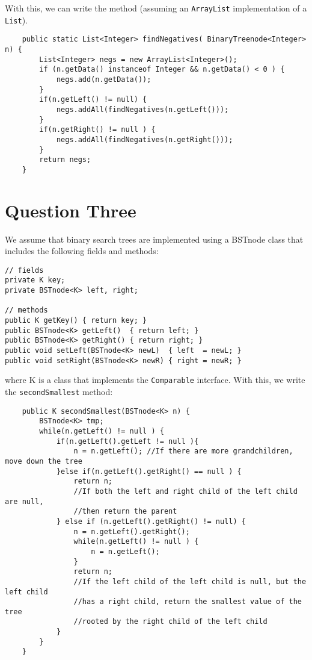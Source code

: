 \documentclass[11pt,letterpaper]{article}
\begin{document}
With this, we can write the method (assuming an \texttt{ArrayList} implementation of a \texttt{List}).
\begin{lstlisting}
	public static List<Integer> findNegatives( BinaryTreenode<Integer> n) { 
		List<Integer> negs = new ArrayList<Integer>();
		if (n.getData() instanceof Integer && n.getData() < 0 ) {
			negs.add(n.getData());
		}
		if(n.getLeft() != null) {
			negs.addAll(findNegatives(n.getLeft()));
		}
		if(n.getRight() != null ) {
			negs.addAll(findNegatives(n.getRight()));
		}
		return negs;	
	}
\end{lstlisting}


\section{Question Three}
We assume that binary search trees are implemented using a BSTnode class that includes the following fields and methods:
\begin{lstlisting}
// fields
private K key;
private BSTnode<K> left, right;
 
// methods
public K getKey() { return key; }
public BSTnode<K> getLeft()  { return left; }
public BSTnode<K> getRight() { return right; }
public void setLeft(BSTnode<K> newL)  { left  = newL; }
public void setRight(BSTnode<K> newR) { right = newR; }
\end{lstlisting}
where K is a class that implements the \texttt{Comparable} interface. With this, we write the \texttt{secondSmallest} method:
\begin{lstlisting}
	public K secondSmallest(BSTnode<K> n) {
		BSTnode<K> tmp;
		while(n.getLeft() != null ) {
			if(n.getLeft().getLeft != null ){
				n = n.getLeft(); //If there are more grandchildren, move down the tree
			}else if(n.getLeft().getRight() == null ) {
				return n; 
				//If both the left and right child of the left child are null,
				//then return the parent
			} else if (n.getLeft().getRight() != null) {
				n = n.getLeft().getRight();
				while(n.getLeft() != null ) {
					n = n.getLeft();
				}
				return n;
				//If the left child of the left child is null, but the left child
				//has a right child, return the smallest value of the tree
				//rooted by the right child of the left child
			}
		}
	}
\end{lstlisting}
\end{document}
